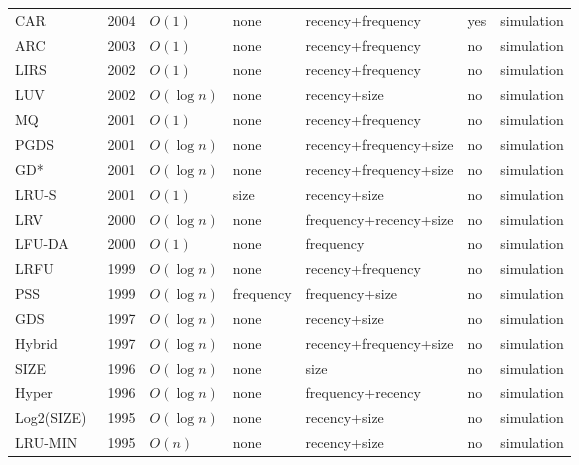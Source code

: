 \documentclass{article}
\begin{document}
\begin{table*}[!ht]
\begin{tabular}{| p{2.3cm}p{0.6cm}p{1cm}p{1.6cm}p{3.6cm}p{1.2cm}p{2.3cm}|}
    CAR~\cite{bansal2004car} & 2004 &  $O(1)$ & none & recency+frequency & yes & simulation \\
    ARC~\cite{megiddo2003arc} & 2003 &  $O(1)$ & none & recency+frequency & no & simulation \\
    LIRS~\cite{jiang2002lirs} & 2002 &  $O(1)$ & none & recency+frequency & no & simulation \\
    LUV~\cite{bahn2002efficient} & 2002 &  $O(\log n)$ & none & recency+size & no & simulation \\
    MQ~\cite{zhou2001multi}  & 2001 &  $O(1)$ & none & recency+frequency & no & simulation \\
    PGDS~\cite{cherkasova2001role} & 2001 &  $O(\log n)$ & none & recency+frequency+size & no & simulation \\
    GD*~\cite{jin2001greedydual} & 2001 &  $O(\log n)$ & none & recency+frequency+size & no & simulation \\
    LRU-S~\cite{starobinski2001probabilistic} & 2001 &  $O(1)$ & size & recency+size & no & simulation \\
    LRV~\cite{rizzo2000replacement} & 2000 &  $O(\log n)$ & none & frequency+recency+size & no & simulation \\
    \mbox{LFU-DA~\cite{arlitt2000evaluating,shah20101}} & 2000 &  $O(1)$ & none & frequency & no & simulation \\
    LRFU~\cite{lee1999existence} & 1999 &  $O(\log n)$ & none & recency+frequency & no & simulation \\
    PSS~\cite{aggarwal1999caching} & 1999 &  $O(\log n)$ & frequency & frequency+size & no & simulation \\
    GDS~\cite{cao1997cost} & 1997 &  $O(\log n)$ & none & recency+size & no & simulation \\
    Hybrid~\cite{wooster1997proxy} & 1997 &  $O(\log n)$ & none & recency+frequency+size & no & simulation \\
    SIZE~\cite{abrams1996removal} & 1996 &  $O(\log n)$ & none & size & no & simulation \\
    Hyper~\cite{abrams1996removal} & 1996 &  $O(\log n)$ & none & frequency+recency & no & simulation \\
    Log2(SIZE)~\cite{abrams1995} & 1995 &  $O(\log n)$ & none & recency+size & no & simulation \\
    LRU-MIN~\cite{abrams1995} & 1995 &  $O(n)$ & none & recency+size & no & simulation \\

\end{tabular}
\end{table*}
\end{document}
